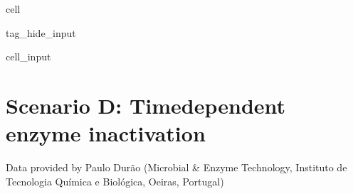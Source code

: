 \documentclass[letterpaper,12pt,english]{jupyterBook}
\begin{document}
\begin{sphinxuseclass}{cell}
\begin{sphinxuseclass}{tag_hide_input}
\begin{sphinxVerbatimInput}
\begin{sphinxuseclass}{cell_input}
\begin{sphinxVerbatim}[commandchars=\\\{\}]
      
        \PYG{p}{[} \PYG{p}{]}

      

    


      
     
\end{sphinxVerbatim}

\end{sphinxuseclass}\end{sphinxVerbatimInput}

\end{sphinxuseclass}
\end{sphinxuseclass}
\sphinxstepscope


\section{Scenario D: Time\sphinxhyphen{}dependent enzyme inactivation}
\label{\detokenize{scenarios/enzyme_inactivation:scenario-d-br-time-dependent-enzyme-inactivation}}\label{\detokenize{scenarios/enzyme_inactivation::doc}}
\sphinxAtStartPar
Data provided by Paulo Durão (Microbial \& Enzyme Technology, Instituto de Tecnologia Química e Biológica, Oeiras, Portugal)
\end{document}
